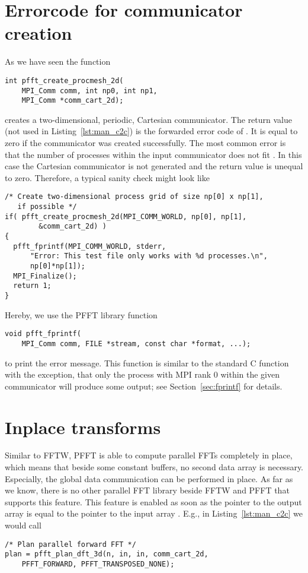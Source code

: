 \section{Errorcode for communicator creation}
As we have seen the function
\begin{lstlisting}
int pfft_create_procmesh_2d(
    MPI_Comm comm, int np0, int np1,
    MPI_Comm *comm_cart_2d);
\end{lstlisting}
creates a two-dimensional, periodic, Cartesian communicator. The  return value
(not used in Listing~\ref{lst:man_c2c}) is the forwarded error code of .
It is equal to zero if the communicator was created successfully.
The most common error is that the number of processes within the input
communicator  does not fit . In this case the Cartesian communicator
is not generated and the return value is unequal to zero. Therefore, a typical sanity check might look like
\begin{lstlisting}
/* Create two-dimensional process grid of size np[0] x np[1],
   if possible */
if( pfft_create_procmesh_2d(MPI_COMM_WORLD, np[0], np[1],
        &comm_cart_2d) )
{
  pfft_fprintf(MPI_COMM_WORLD, stderr,
      "Error: This test file only works with %d processes.\n",
      np[0]*np[1]);
  MPI_Finalize();
  return 1;
}
\end{lstlisting}
Hereby, we use the PFFT library function
\begin{lstlisting}
void pfft_fprintf(
    MPI_Comm comm, FILE *stream, const char *format, ...);
\end{lstlisting}
to print the error message.
This function is similar to the standard C function  with the exception, that only the process with MPI rank $0$
within the given communicator  will produce some output; see Section~\ref{sec:fprintf} for details.

\section{Inplace transforms}
Similar to FFTW, PFFT is able to compute parallel FFTs completely in place, which means that beside some
constant buffers, no second data array is necessary. Especially, the global data communication
can be performed in place. As far as we know, there is no other parallel FFT library beside FFTW and PFFT that
supports this feature.
This feature is enabled as soon as the pointer to the output array  is equal to the pointer to the input array .
E.g., in Listing~\ref{lst:man_c2c} we would call
\begin{lstlisting}[firstnumber=34]
/* Plan parallel forward FFT */
plan = pfft_plan_dft_3d(n, in, in, comm_cart_2d,
    PFFT_FORWARD, PFFT_TRANSPOSED_NONE);
\end{lstlisting}

